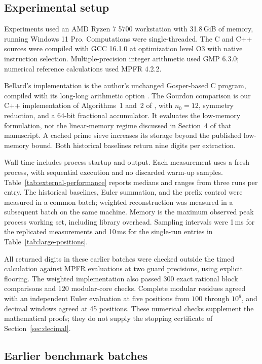 \documentclass[11pt]{article}
\numberwithin{equation}{section}
\theoremstyle{definition}
\begin{document}
\subsection{Experimental setup}\label{sec:performance}

Experiments used an AMD Ryzen 7 5700 workstation with 31.8\,GiB of
memory, running Windows 11 Pro. Computations were single-threaded.
The C and C++ sources were compiled with GCC 16.1.0 at optimization
level O3 with native instruction selection. Multiple-precision
integer arithmetic used GMP 6.3.0; numerical reference calculations
used MPFR 4.2.2.

Bellard's implementation is the author's unchanged Gosper-based C
program, compiled with its long-long arithmetic option
\cite{Bellard97}. The Gourdon comparison is our C++ implementation
of Algorithms~1 and~2 of \cite{Gourdon03}, with $n_0=12$, symmetry
reduction, and a 64-bit fractional accumulator. It evaluates the
low-memory formulation, not the linear-memory regime discussed in
Section~4 of that manuscript. A cached prime sieve increases its
storage beyond the published low-memory bound. Both historical
baselines return nine digits per extraction.

Wall time includes process startup and output. Each measurement
uses a fresh process, with sequential execution and no discarded
warm-up samples. Table~\ref{tab:external-performance} reports medians
and ranges from three runs per entry. The historical baselines,
Euler summation, and the prefix control were measured in a common
batch; weighted reconstruction was measured in a subsequent batch
on the same machine. Memory is the maximum observed peak process
working set, including library overhead. Sampling intervals were
1\,ms for the replicated measurements and 10\,ms for the single-run
entries in Table~\ref{tab:large-positions}.

All returned digits in these earlier batches were checked outside the timed calculation
against MPFR evaluations at two guard precisions, using explicit
flooring. The weighted implementation also passed 300 exact rational
block comparisons and 120 modular-core checks. Complete modular
residues agreed with an independent Euler evaluation at five positions
from $100$ through $10^6$, and decimal windows agreed at 45 positions.
These numerical checks supplement the mathematical proofs; they do
not supply the stopping certificate of Section~\ref{sec:decimal}.

\subsection{Earlier benchmark batches}\label{sec:external-comparison}
\end{document}
